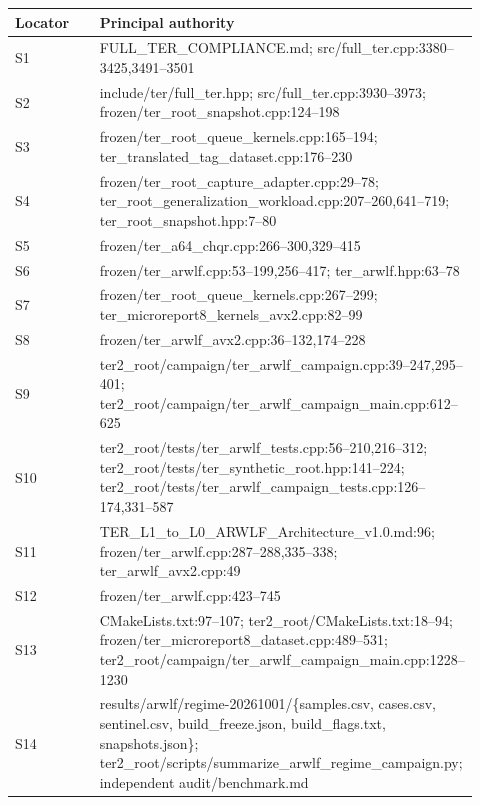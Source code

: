 \documentclass[10pt,letterpaper]{article}
\begin{document}
{\small\setlength{\tabcolsep}{3pt}\begin{longtable}{p{0.461\linewidth} p{0.461\linewidth}}
\toprule

\textbf{Locator} & \textbf{Principal authority} \\
\midrule\endhead

S1 & FULL\_TER\_COMPLIANCE.md; src/full\_ter.cpp:3380--3425,3491--3501 \\

S2 & include/ter/full\_ter.hpp; src/full\_ter.cpp:3930--3973; frozen/ter\_root\_snapshot.cpp:124--198 \\

S3 & frozen/ter\_root\_queue\_kernels.cpp:165--194; ter\_translated\_tag\_dataset.cpp:176--230 \\

S4 & frozen/ter\_root\_capture\_adapter.cpp:29--78; ter\_root\_generalization\_workload.cpp:207--260,641--719; ter\_root\_snapshot.hpp:7--80 \\

S5 & frozen/ter\_a64\_chqr.cpp:266--300,329--415 \\

S6 & frozen/ter\_arwlf.cpp:53--199,256--417; ter\_arwlf.hpp:63--78 \\

S7 & frozen/ter\_root\_queue\_kernels.cpp:267--299; ter\_microreport8\_kernels\_avx2.cpp:82--99 \\

S8 & frozen/ter\_arwlf\_avx2.cpp:36--132,174--228 \\

S9 & ter2\_root/campaign/ter\_arwlf\_campaign.cpp:39--247,295--401; ter2\_root/campaign/ter\_arwlf\_campaign\_main.cpp:612--625 \\

S10 & ter2\_root/tests/ter\_arwlf\_tests.cpp:56--210,216--312; ter2\_root/tests/ter\_synthetic\_root.hpp:141--224; ter2\_root/tests/ter\_arwlf\_campaign\_tests.cpp:126--174,331--587 \\

S11 & TER\_L1\_to\_L0\_ARWLF\_Architecture\_v1.0.md:96; frozen/ter\_arwlf.cpp:287--288,335--338; ter\_arwlf\_avx2.cpp:49 \\

S12 & frozen/ter\_arwlf.cpp:423--745 \\

S13 & CMakeLists.txt:97--107; ter2\_root/CMakeLists.txt:18--94; frozen/ter\_microreport8\_dataset.cpp:489--531; ter2\_root/campaign/ter\_arwlf\_campaign\_main.cpp:1228--1230 \\

S14 & results/arwlf/regime-20261001/\{samples.csv, cases.csv, sentinel.csv, build\_freeze.json, build\_flags.txt, snapshots.json\}; ter2\_root/scripts/summarize\_arwlf\_regime\_campaign.py; independent audit/benchmark.md \\

\bottomrule\end{longtable}}
\end{document}
